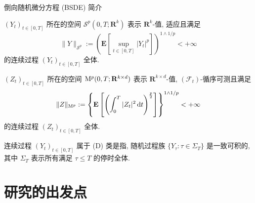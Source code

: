 \documentclass[xcolor=svgnames,serif,table,10pt]{beamer}
\newcommand{\rtn}{\mathrm{\mathbf{R}}}
\newcommand*{\EX}{\mathrm{\mathbf{E}}}
\newcommand*{\dif}{\,\mathrm{d}}
\newcommand*{\F}{\mathcal{F}}
\newcommand{\tT}[1][0]{[#1,T]}
\newcommand{\s}{\mathcal{S}}
\renewcommand{\M}{{\rm M}}
\begin{document}
\begin{frame}{倒向随机微分方程 (BSDE) 简介}
\scriptsize
  \begin{block}{$(Y_t)_{t\in\tT}$ 所在的空间}
    ${\s}^p(0,T;\rtn^k)$  表示 $\rtn^k$-值, 适应且满足
    $$\|Y\|_{{\s}^p}:=
    \left(\EX
      \left[
        \sup_{t\in\tT}|Y_t|^p
      \right]
    \right)^{1\wedge 1/p}<+\infty$$
    的连续过程 $(Y_t)_{t\in\tT}$ 全体.
  \end{block}

  \begin{block}{$(Z_t)_{t\in\tT}$ 所在的空间}
    $\M^p(0,T;\rtn^{k\times d})$ 表示
    ${\rtn}^{k\times d}$-值, $(\F_t)$-循序可测且满足
    $$\|Z\|_{{\M}^p}:=
      \left\{\EX
      \left[
        \left(
          \int_0^T |Z_t|^2\dif t
        \right)^{p\over 2}
      \right]
      \right\}^{1\wedge 1/p}<+\infty$$
    的连续过程 $(Z_t)_{t\in\tT}$ 全体.
  \end{block}

  \qquad 连续过程 $(Y_t)_{t\in\tT}$ 属于 (D) 类是指, 随机过程族
$\{Y_\tau:\tau\in\Sigma_T\}$
是一致可积的, 其中 $\Sigma_T$ 表示所有满足 $\tau\leq T$ 的停时全体.
\end{frame}

\section{研究的出发点}

\end{document}
